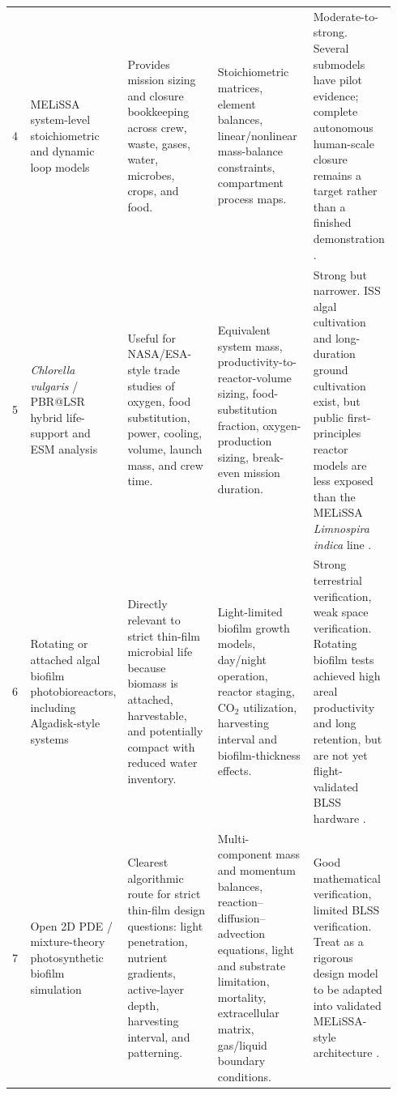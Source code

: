 \documentclass[11pt]{article}
\newcommand{\MEL}{MELiSSA}
\newcommand{\BLSS}{BLSS}
\newcommand{\Limno}{\textit{Limnospira indica}}
\newcommand{\Chl}{\textit{Chlorella vulgaris}}
\begin{document}
\begin{landscape}
\begin{longtable}{P{0.05\linewidth}P{0.18\linewidth}P{0.27\linewidth}P{0.26\linewidth}P{0.18\linewidth}}
4 & \MEL{} system-level stoichiometric and dynamic loop models & Provides mission sizing and closure bookkeeping across crew, waste, gases, water, microbes, crops, and food. & Stoichiometric matrices, element balances, linear/nonlinear mass-balance constraints, compartment process maps. & Moderate-to-strong. Several submodels have pilot evidence; complete autonomous human-scale closure remains a target rather than a finished demonstration \parencite[Abstract, sec. 5]{vermeulen2023}.\\
5 & \Chl{} / PBR@LSR hybrid life-support and ESM analysis & Useful for NASA/ESA-style trade studies of oxygen, food substitution, power, cooling, volume, launch mass, and crew time. & Equivalent system mass, productivity-to-reactor-volume sizing, food-substitution fraction, oxygen-production sizing, break-even mission duration. & Strong but narrower. ISS algal cultivation and long-duration ground cultivation exist, but public first-principles reactor models are less exposed than the \MEL{} \Limno{} line \parencite[3--5, 7--8]{detrell2021}.\\
6 & Rotating or attached algal biofilm photobioreactors, including Algadisk-style systems & Directly relevant to strict thin-film microbial life because biomass is attached, harvestable, and potentially compact with reduced water inventory. & Light-limited biofilm growth models, day/night operation, reactor staging, CO$_2$ utilization, harvesting interval and biofilm-thickness effects. & Strong terrestrial verification, weak space verification. Rotating biofilm tests achieved high areal productivity and long retention, but are not yet flight-validated \BLSS{} hardware \parencite[2436--2445]{blanken2014}\parencite[abstract]{blanken2016}.\\
7 & Open 2D PDE / mixture-theory photosynthetic biofilm simulation & Clearest algorithmic route for strict thin-film design questions: light penetration, nutrient gradients, active-layer depth, harvesting interval, and patterning. & Multi-component mass and momentum balances, reaction--diffusion--advection equations, light and substrate limitation, mortality, extracellular matrix, gas/liquid boundary conditions. & Good mathematical verification, limited \BLSS{} verification. Treat as a rigorous design model to be adapted into validated \MEL{}-style architecture \parencite[1, 3--5]{polizzi2022}.\\
\bottomrule
\end{longtable}
\end{landscape}
\end{document}
